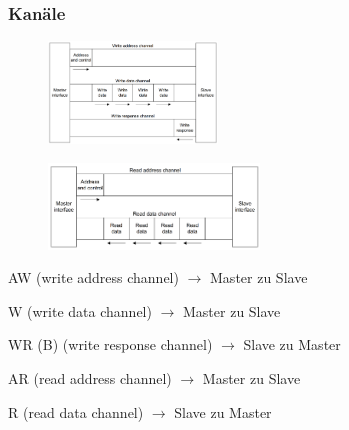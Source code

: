 \subsubsection{Kanäle}
\begin{multicols}{2}
    \begin{figure}[H]
     	\includegraphics[width=0.4\textwidth]{images/AXI_Write_Data_Channels.png}
     \end{figure}
     \begin{figure}[H]
     	\includegraphics[width=0.5\textwidth]{images/AXI_Read_Data_Channels.png}
     \end{figure}
\end{multicols}
\begin{multicols}{2}
    \begin{compactitem}
        \item AW (write address channel) $\rightarrow$ Master zu Slave
        \item W (write data channel) $\rightarrow$ Master zu Slave
        \item WR (B) (write response channel) $\rightarrow$ Slave zu Master
        \item AR (read address channel) $\rightarrow$ Master zu Slave
        \item R (read data channel) $\rightarrow$ Slave zu Master
    \end{compactitem}
\end{multicols}

